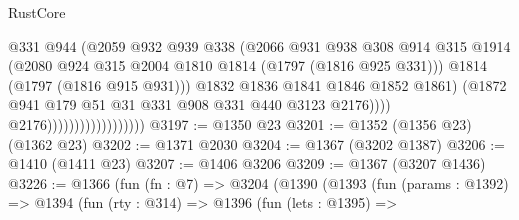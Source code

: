 \begin{lexlean}{RustCore}
\begin{coremodule}
                                              @331
                                              @944
                                              (@2059
                                                @932
                                                @939
                                                @338
                                                (@2066
                                                  @931
                                                  @938
                                                  @308
                                                  @914
                                                  @315
                                                  @1914
                                                  (@2080
                                                    @924
                                                    @315
                                                    @2004
                                                    @1810
                                                    @1814
                                                    (@1797 (@1816 @925 @331)))
                                                  @1814
                                                  (@1797 (@1816 @915 @931)))
                                                @1832
                                                @1836
                                                @1841
                                                @1846
                                                @1852
                                                @1861)
                                              (@1872
                                                @941
                                                @179
                                                @51
                                                @31
                                                @331
                                                @908
                                                @331
                                                @440
                                                @3123
                                                @2176))))
                                        @2176))))))))))))))))))
@3197 := @1350 @23
@3201 := @1352 (@1356 @23) (@1362 @23)
@3202 := @1371 @2030
@3204 := @1367 (@3202 @1387)
@3206 := @1410 (@1411 @23)
@3207 := @1406 @3206
@3209 := @1367 (@3207 @1436)
@3226 := @1366
    (fun (fn : @7) =>
    @3204
      (@1390
        (@1393
          (fun (params : @1392) =>
          @1394
            (fun (rty : @314) =>
            @1396
              (fun (lets : @1395) =>

\end{coremodule}
\end{lexlean}
